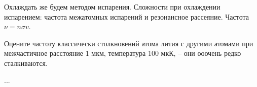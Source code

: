 Охлаждать же будем методом испарения. Сложности при охлаждении испарением: частота межатомных испарений и резонансное рассеяние. Частота $\nu = n \sigma v$.  

\newpage

\begin{hw2}
\item Оцените частоту классически столкновений атома лития с другими атомами при межчастичное расстояние 1 мкм, температура 100 мкК, -- они ооочень редко сталкиваются. 
\item ...
\end{hw2}